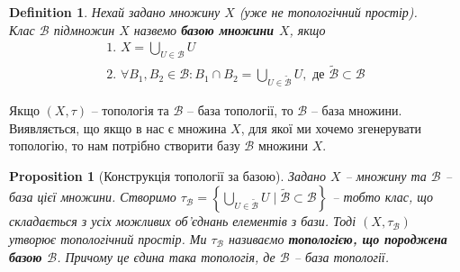 \documentclass[a4paper, 10pt]{article}
\theoremstyle{theoremdd}
\newtheorem{definition}[theorem]{Definition}
\newtheorem{proposition}[theorem]{Proposition}
\begin{document}
\begin{definition}
Нехай задано множину $X$ (уже не топологічний простір).\\
Клас $\mathcal{B}$ підмножин $X$ назвемо \textbf{базою множини $X$}, якщо
\begin{align*}
\text{1. } X = \bigcup_{U \in \mathcal{B}} U \\
\text{2. } \forall B_1,B_2 \in \mathcal{B}: B_1 \cap B_2 = \bigcup_{U \in \mathcal{\tilde{B}}} U, \text{ де } \mathcal{\tilde{B}} \subset \mathcal{B}
\end{align*} 
\end{definition}
\noindent
Якщо $(X,\tau)$ -- топологія та $\mathcal{B}$ -- база топології, то $\mathcal{B}$ -- база множини.\\
Виявляється, що якщо в нас є множина $X$, для якої ми хочемо згенерувати топологію, то нам потрібно створити базу $\mathcal{B}$ множини $X$.

\begin{proposition}[Конструкція топології за базою]
Задано $X$ -- множину та $\mathcal{B}$ -- база цієї множини. Створимо $\tau_{\mathcal{B}} = \left\{ \displaystyle\bigcup_{U \in \mathcal{\mathcal{\tilde{B}}}} U \mid \mathcal{\tilde{B}} \subset \mathcal{B} \right\}$ -- тобто клас, що складається з усіх можливих об'єднань елементів з бази. Тоді $(X,\tau_{\mathcal{B}})$ утворює топологічний простір. Ми $\tau_{\mathcal{B}}$ називаємо \textbf{топологією, що породжена базою $\mathcal{B}$}. Причому це єдина така топологія, де $\mathcal{B}$ -- база топології.
\end{proposition}
\end{document}
